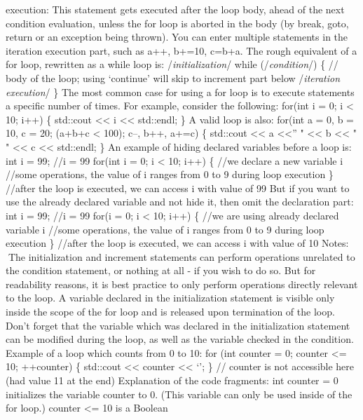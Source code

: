 execution: This statement gets executed after the loop body, ahead of
the next condition evaluation, unless the for loop is aborted in the
body (by break, goto, return or an exception being thrown). You can
enter multiple statements in the iteration execution part, such as a++,
b+=10, c=b+a. The rough equivalent of a for loop, rewritten as a while
loop is: /\emph{initialization}/ while (/\emph{condition}/) \{ // body
of the loop; using `continue' will skip to increment part below
/\emph{iteration execution}/ \} The most common case for using a for
loop is to execute statements a speciﬁc number of times. For example,
consider the following: for(int i = 0; i \textless{} 10; i++) \{
std::cout \textless\textless{} i \textless\textless{} std::endl; \} A
valid loop is also: for(int a = 0, b = 10, c = 20; (a+b+c \textless{}
100); c--, b++, a+=c) \{ std::cout \textless\textless{} a
\textless\textless{}'' " \textless\textless{} b \textless\textless{} " "
\textless\textless{} c \textless\textless{} std::endl; \} An example of
hiding declared variables before a loop is: int i = 99; //i = 99 for(int
i = 0; i \textless{} 10; i++) \{ //we declare a new variable i //some
operations, the value of i ranges from 0 to 9 during loop execution \}
//after the loop is executed, we can access i with value of 99 But if
you want to use the already declared variable and not hide it, then omit
the declaration part: int i = 99; //i = 99 for(i = 0; i \textless{} 10;
i++) \{ //we are using already declared variable i //some operations,
the value of i ranges from 0 to 9 during loop execution \} //after the
loop is executed, we can access i with value of 10 Notes: The
initialization and increment statements can perform operations unrelated
to the condition statement, or nothing at all - if you wish to do so.
But for readability reasons, it is best practice to only perform
operations directly relevant to the loop. A variable declared in the
initialization statement is visible only inside the scope of the for
loop and is released upon termination of the loop. Don't forget that the
variable which was declared in the initialization statement can be
modiﬁed during the loop, as well as the variable checked in the
condition. Example of a loop which counts from 0 to 10: for (int counter
= 0; counter \textless= 10; ++counter) \{ std::cout \textless\textless{}
counter \textless\textless{} `\n'; \} // counter is not accessible here
(had value 11 at the end) Explanation of the code fragments: int counter
= 0 initializes the variable counter to 0. (This variable can only be
used inside of the for loop.) counter \textless= 10 is a Boolean
